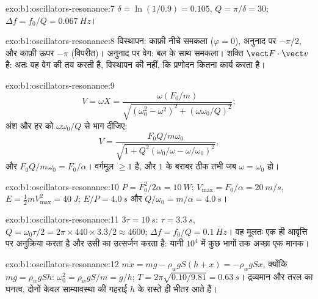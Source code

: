 \begin{solution}{exo:b1:oscillators-resonance:7}
$\delta = \ln(1/0.9) = 0.105$, $Q = \pi/\delta = 30$; $\Delta f = f_0/Q =
\qty{0.067}{Hz}$।
\end{solution}

\begin{solution}{exo:b1:oscillators-resonance:8}
विस्थापन: काफ़ी नीचे समकला ($\varphi = 0$), अनुनाद पर $-\pi/2$, और काफ़ी
ऊपर $-\pi$ (विपरीत)। अनुनाद पर वेग: बल के साथ समकला। शक्ति
$\vect F\cdot\vect v$ है: अतः यह वेग की  तय करती है, विस्थापन की नहीं,
कि प्रणोदन कितना कार्य करता है।
\end{solution}

\begin{solution}{exo:b1:oscillators-resonance:9}
\[
V = \omega X = \frac{\omega(F_0/m)}{\sqrt{(\omega_0^2 - \omega^2)^2 + (\omega\omega_0/Q)^2}} ;
\]
अंश और हर को $\omega\omega_0/Q$ से भाग दीजिए:
\[
V = \frac{F_0Q/m\omega_0}{\sqrt{1 + Q^2(\omega_0/\omega - \omega/\omega_0)^2}} ,
\]
और $F_0Q/m\omega_0 = F_0/\alpha$।
वर्गमूल $\geq 1$ है, और $1$ के बराबर ठीक तभी जब $\omega = \omega_0$ हो।
\end{solution}

\begin{solution}{exo:b1:oscillators-resonance:10}
$P = F_0^2/2\alpha = \qty{10}{W}$; $V_{\max} = F_0/\alpha = \qty{20}{m/s}$,
$E = \tfrac12 mV_{\max}^2 = \qty{40}{J}$; $E/P = \qty{4.0}{s}$ और $Q/\omega_0 =
m/\alpha = \qty{4.0}{s}$।
\end{solution}

\begin{solution}{exo:b1:oscillators-resonance:11}
$3\tau = \qty{10}{s}$: $\tau = \qty{3.3}{s}$, $Q = \omega_0\tau/2 = 2\pi \times
440 \times 3.3/2 \approx 4600$; $\Delta f = f_0/Q = \qty{0.1}{Hz}$। वह
मूलतः एक ही आवृत्ति पर अनुक्रिया करता है और उसी का उत्सर्जन करता है: यानी
$10^4$ में कुछ भागों तक अच्छा एक मानक।
\end{solution}

\begin{solution}{exo:b1:oscillators-resonance:12}
$m\ddot x = mg - \rho_wgS(h + x) = -\rho_wgSx$,
क्योंकि $mg = \rho_wgSh$:
$\omega_0^2 = \rho_wgS/m = g/h$; $T = 2\pi\sqrt{0.10/9.81} = \qty{0.63}{s}$।
द्रव्यमान और तरल का घनत्व, दोनों केवल साम्यावस्था की गहराई $h$ के रास्ते
ही भीतर आते हैं।
\end{solution}


